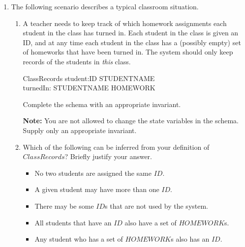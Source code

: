 \documentclass{article}
\begin{document}
\begin{enumerate}
\begin{enumerate}
\end{enumerate}

\item The following scenario describes a typical classroom
situation.

\begin{enumerate} \item A teacher needs to keep track of
which homework assignments each student in the class has turned
in. Each student in the class is given an ID, and at any time each
student in the class has a (possibly empty) set of homeworks that
have been turned in. The system should only keep records of the
students in {\em this\/} class.

\begin{zed}
\end{zed}
\begin{schema}{ClassRecords}
    student:ID \pfun STUDENTNAME \\
    turnedIn: STUDENTNAME \pfun \power HOMEWORK
\where
\color{blue}
\end{schema}

Complete the schema with an appropriate invariant.

\textbf{Note:} You are not allowed to change the state variables
in the schema. Supply only an appropriate invariant.


\item Which of the following can be inferred from your definition
of $ClassRecords$? Briefly justify your answer.

\begin{itemize}
\item No two students are assigned the same $ID$.

\item A given student may have more than one $ID$.

\item There may be some $ID$s that are not used by the system.

\item All students that have an $ID$ also have a set of
$HOMEWORK$s.

\item Any student who has a set of $HOMEWORK$s also has an $ID$.


\end{itemize}
\end{enumerate}
\end{enumerate}
\end{document}
